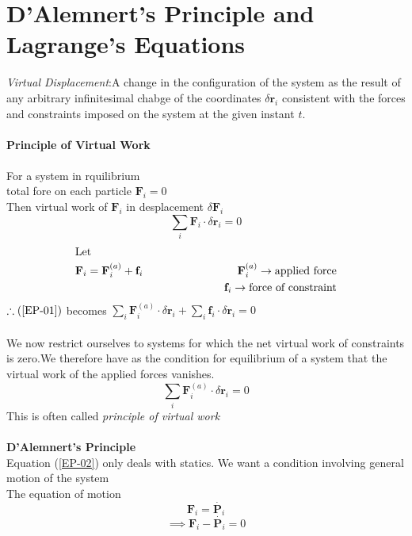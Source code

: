 \section{D'Alemnert's Principle and Lagrange's Equations}
\textit{Virtual Displacement}:A change in the configuration of the system as the result of any arbitrary infinitesimal chabge of the coordinates $\delta \textbf{r}_i$ consistent with the forces and constraints imposed on the system at the given instant $t$.\\\\
\textbf{Principle of Virtual Work}\\\\
For a system in rquilibrium\\
total fore on each particle $\textbf{F}_i=0$\\
Then virtual work of $\textbf{F}_i$ in desplacement $\delta \textbf{F}_i$
\begin{equation}
\sum\limits_{i}\textbf{F}_i\cdot\delta \textbf{r}_i=0\label{EP-01}
\end{equation}
\begin{align*}
\intertext{Let}
\textbf{F}_i=\textbf{F}_i^{(a)}+\textbf{f}_i\hspace{3cm}\textbf{F}_i^{(a)}\rightarrow \text{applied force}\\
\textbf{f}_i\rightarrow \text{force of constraint}\\
\end{align*}
$\therefore (\ref{EP-01}) $ \quad becomes \quad $\sum_{i} \mathbf{F}_{i}^{(a)} \cdot \delta \mathbf{r}_{i}+\sum_{i} \mathbf{f}_{i} \cdot \delta \mathbf{r}_{i}=0$ \\\\
We now restrict ourselves to systems for which the net virtual work of constraints is zero.We therefore have as the condition for equilibrium of a system that the virtual work of the applied forces vanishes.
\begin{equation}
\sum_{i} \mathbf{F}_{i}^{(a)} \cdot \delta \mathbf{r}_{i}=0\label{EP-02}
\end{equation}
This is often called \textit{principle of virtual work}\\\\
\textbf{D'Alemnert's Principle}\\
Equation (\ref{EP-02})  only deals with statics. We want a condition involving general motion of the system\\
The equation of motion 
$$\textbf{F}_i=\dot{\textbf{P}_i}$$
$$\implies \textbf{F}_i-\dot{\textbf{P}_i}=0$$
